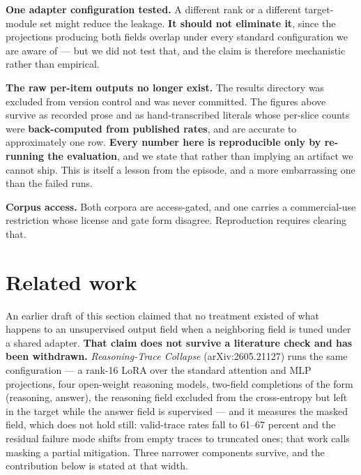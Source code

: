\documentclass[10pt]{article}
\begin{document}
\textbf{One adapter configuration tested.} A different rank or a different target-module set might reduce
the leakage. \textbf{It should not eliminate it}, since the projections producing both fields overlap
under every standard configuration we are aware of --- but we did not test that, and the claim is
therefore mechanistic rather than empirical.

\textbf{The raw per-item outputs no longer exist.} The results directory was excluded from version
control and was never committed. The figures above survive as recorded prose and as hand-transcribed
literals whose per-slice counts were \textbf{back-computed from published rates}, and are accurate to
approximately one row. \textbf{Every number here is reproducible only by re-running the evaluation}, and
we state that rather than implying an artifact we cannot ship. This is itself a lesson from the
episode, and a more embarrassing one than the failed runs.

\textbf{Corpus access.} Both corpora are access-gated, and one carries a commercial-use restriction whose
license and gate form disagree. Reproduction requires clearing that.



\section{Related work}

An earlier draft of this section claimed that no treatment existed of what happens to an unsupervised
output field when a neighboring field is tuned under a shared adapter. \textbf{That claim does not survive
a literature check and has been withdrawn.} \emph{Reasoning-Trace Collapse} (arXiv:2605.21127) runs the
same configuration --- a rank-16 LoRA over the standard attention and MLP projections, four open-weight
reasoning models, two-field completions of the form (reasoning, answer), the reasoning field excluded
from the cross-entropy but left in the target while the answer field is supervised --- and it measures
the masked field, which does not hold still: valid-trace rates fall to 61--67 percent and the residual
failure mode shifts from empty traces to truncated ones; that work calls masking a partial
mitigation. Three narrower components survive, and the contribution below is stated at that width.
\end{document}
